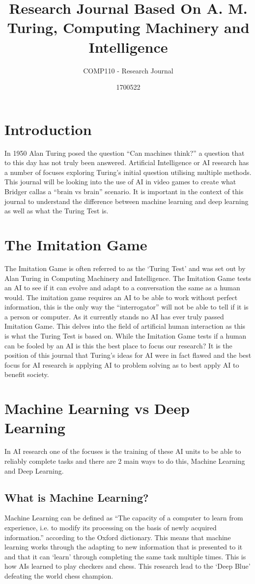 \documentclass[10pt,a4paper]{scrartcl}
\title{Research Journal Based On A. M. Turing, Computing Machinery and Intelligence}
\subtitle{COMP110 - Research Journal}
\author{1700522}
\begin{document}
	\maketitle
	\begin{multicols}{2}
	\section{Introduction}
	In 1950 Alan Turing posed the question ``Can machines think?''\cite{turingComputing} a 		 question that to this day has not truly been answered. Artificial Intelligence or AI research has a number of focuses exploring Turing's initial question utilising multiple methods. This journal will be looking into the use of AI in video games to create what Bridger callas a ``brain vs brain''\cite{BridgerFundamentalAI} scenario. It is important in the context of this journal to understand the difference between machine learning and deep learning as well as what the Turing Test is. 
	\section{The Imitation Game}
The Imitation Game is often referred to as the `Turing Test' and was set out by Alan Turing in Computing Machinery and Intelligence\cite{turingComputing}. The Imitation Game tests an AI to see if it can evolve and adapt to a conversation the same as a human would. The imitation game requires an AI to be able to work without perfect information, this is the only way the ``interrogator'' will not be able to tell if it is a person or computer. As it currently stands no AI has ever truly passed Imitation Game. This delves into the field of artificial human interaction as this is what the Turing Test is based on. While the Imitation Game tests if a human can be fooled by an AI is this the best place to focus our research? It is the position of this journal that Turing's ideas for AI were in fact flawed and the best focus for AI research is applying AI to problem solving as to best apply AI to benefit society.   
	\section{Machine Learning vs Deep Learning}
		In AI research one of the focuses is the training of these AI units to be able to reliably complete tasks and there are 2 main ways to do this, Machine Learning and Deep Learning.
		\subsection{What is Machine Learning?}
		Machine Learning can be defined as ``The capacity of a computer to learn from experience, i.e. to modify its processing on the basis of newly acquired information.'' according to the Oxford dictionary\cite{OxfordDictionary}. This means that machine learning works through the adapting to new information that is presented to it and that it can `learn' through completing the same task multiple times. This is how AIs learned to play checkers\cite{SamuelCheckers} and chess\cite{ShannonChess}. This research lead to the `Deep Blue' defeating the world chess champion\cite{DeepBlue}. 
		

\end{multicols}
\end{document}
